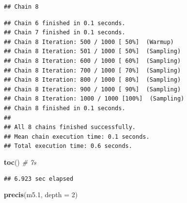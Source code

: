 \documentclass[
]{article}
\newenvironment{Shaded}{\begin{snugshade}}{\end{snugshade}}
\newcommand{\AttributeTok}[1]{\textcolor[rgb]{0.13,0.29,0.53}{#1}}
\newcommand{\CommentTok}[1]{\textcolor[rgb]{0.56,0.35,0.01}{\textit{#1}}}
\newcommand{\DecValTok}[1]{\textcolor[rgb]{0.00,0.00,0.81}{#1}}
\newcommand{\FloatTok}[1]{\textcolor[rgb]{0.00,0.00,0.81}{#1}}
\newcommand{\FunctionTok}[1]{\textcolor[rgb]{0.13,0.29,0.53}{\textbf{#1}}}
\newcommand{\NormalTok}[1]{#1}
\begin{document}
\begin{verbatim}
## Chain 8
\end{verbatim}

\begin{verbatim}
## Chain 6 finished in 0.1 seconds.
## Chain 7 finished in 0.1 seconds.
## Chain 8 Iteration: 500 / 1000 [ 50%]  (Warmup) 
## Chain 8 Iteration: 501 / 1000 [ 50%]  (Sampling) 
## Chain 8 Iteration: 600 / 1000 [ 60%]  (Sampling) 
## Chain 8 Iteration: 700 / 1000 [ 70%]  (Sampling) 
## Chain 8 Iteration: 800 / 1000 [ 80%]  (Sampling) 
## Chain 8 Iteration: 900 / 1000 [ 90%]  (Sampling) 
## Chain 8 Iteration: 1000 / 1000 [100%]  (Sampling) 
## Chain 8 finished in 0.1 seconds.
## 
## All 8 chains finished successfully.
## Mean chain execution time: 0.1 seconds.
## Total execution time: 0.6 seconds.
\end{verbatim}

\begin{Shaded}
\begin{Highlighting}[]
\FunctionTok{toc}\NormalTok{() }\CommentTok{\# 7s}
\end{Highlighting}
\end{Shaded}

\begin{verbatim}
## 6.923 sec elapsed
\end{verbatim}

\begin{Shaded}
\begin{Highlighting}[]
\FunctionTok{precis}\NormalTok{(m5}\FloatTok{.1}\NormalTok{, }\AttributeTok{depth =} \DecValTok{2}\NormalTok{)}
\end{Highlighting}
\end{Shaded}
\end{document}
